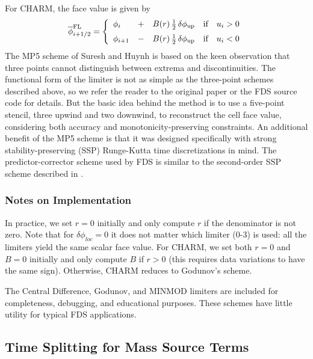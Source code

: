 For CHARM, the face value is given by~\cite{Kempf:2003}
\begin{equation}
\label{eqn_charm_limiter}
\overline{\phi}^{\rm FL}_{i+1/2} = \left\{ \begin{array}{lcll} \phi_i &+& B(r) \,\frac{1}{2} \,\delta \phi_{\rm up} & \mbox{if} \quad u_i>0 \vspace{0.2 cm}\\
\phi_{i+1} &-& B(r) \,\frac{1}{2} \,\delta \phi_{\rm up} & \mbox{if} \quad u_i<0 \end{array} \right.
\end{equation}
The MP5 scheme of Suresh and Huynh \cite{Suresh:1997} is based on the keen observation that three points cannot distinguish between extrema and discontinuities.  The functional form of the limiter is not as simple as the three-point schemes described above, so we refer the reader to the original paper or the FDS source code for details.  But the basic idea behind the method is to use a five-point stencil, three upwind and two downwind, to reconstruct the cell face value, considering both accuracy and monotonicity-preserving constraints.  An additional benefit of the MP5 scheme is that it was designed specifically with strong stability-preserving (SSP) Runge-Kutta time discretizations in mind.  The predictor-corrector scheme used by FDS is similar to the second-order SSP scheme described in \cite{Gottlieb:2001}.


\subsubsection{Notes on Implementation}

In practice, we set $r=0$ initially and only compute $r$ if the denominator is not zero.  Note that for $\delta \phi_{loc}=0$ it does not matter which limiter (0-3) is used: all the limiters yield the same scalar face value.  For CHARM, we set both $r=0$ and $B=0$ initially and only compute $B$ if $r>0$ (this requires data variations to have the same sign). Otherwise, CHARM reduces to Godunov's scheme.

The Central Difference, Godunov, and MINMOD limiters are included for completeness, debugging, and educational purposes.  These schemes have little utility for typical FDS applications.

\subsection{Time Splitting for Mass Source Terms}
\label{sec_time_splitting}

